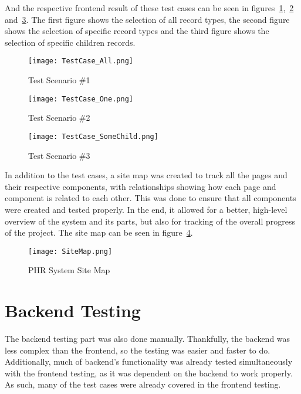 And the respective frontend result of these test cases can be seen in figures~\ref{fig:test1},~\ref{fig:test2} and~\ref{fig:test3}. The first figure shows the selection of all record types, the second figure shows the selection of specific record types and the third figure shows the selection of specific children records.

\begin{figure}[htbp]
    \centering
    \texttt{[image: TestCase\_All.png]}
    \caption{Test Scenario \#1}\label{fig:test1}
\end{figure}


\begin{figure}[htbp]
    \centering
    \texttt{[image: TestCase\_One.png]}
    \caption{Test Scenario \#2}\label{fig:test2}
\end{figure}

\begin{figure}[htbp]
    \centering
    \texttt{[image: TestCase\_SomeChild.png]}
    \caption{Test Scenario \#3}\label{fig:test3}
\end{figure}

\FloatBarrier{}

In addition to the test cases, a site map was created to track all the pages and their respective components, with relationships showing how each page and component is related to each other. This was done to ensure that all components were created and tested properly. In the end, it allowed for a better, high-level overview of the system and its parts, but also for tracking of the overall progress of the project. The site map can be seen in figure~\ref{fig:sitemap}.

\begin{figure}[htbp]
    \centering
    \texttt{[image: SiteMap.png]}
    \caption{PHR System Site Map}\label{fig:sitemap}
\end{figure}

\FloatBarrier{}

\section{Backend Testing}

The backend testing part was also done manually. Thankfully, the backend was less complex than the frontend, so the testing was easier and faster to do. Additionally, much of backend's functionality was already tested simultaneously with the frontend testing, as it was dependent on the backend to work properly. As such, many of the test cases were already covered in the frontend testing.

